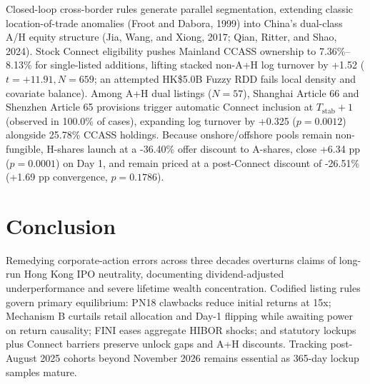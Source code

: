 \documentclass[12pt,letterpaper]{article}
\begin{document}
Closed-loop cross-border rules generate parallel segmentation, extending classic location-of-trade anomalies (Froot and Dabora, 1999) into China's dual-class A/H equity structure (Jia, Wang, and Xiong, 2017; Qian, Ritter, and Shao, 2024). Stock Connect eligibility pushes Mainland CCASS ownership to 7.36\%--8.13\% for single-listed additions, lifting stacked non-A+H log turnover by +1.52 ($t = +11.91, N = 659$; an attempted HK\$5.0B Fuzzy RDD fails local density and covariate balance). Among A+H dual listings ($N = 57$), Shanghai Article 66 and Shenzhen Article 65 provisions trigger automatic Connect inclusion at $T_{\text{stab}} + 1$ (observed in 100.0\% of cases), expanding log turnover by +0.325 ($p = 0.0012$) alongside 25.78\% CCASS holdings. Because onshore/offshore pools remain non-fungible, H-shares launch at a -36.40\% offer discount to A-shares, close +6.34 pp ($p = 0.0001$) on Day 1, and remain priced at a post-Connect discount of -26.51\% (+1.69 pp convergence, $p = 0.1786$).

\section{Conclusion}

Remedying corporate-action errors across three decades overturns claims of long-run Hong Kong IPO neutrality, documenting dividend-adjusted underperformance and severe lifetime wealth concentration. Codified listing rules govern primary equilibrium: PN18 clawbacks reduce initial returns at 15x; Mechanism B curtails retail allocation and Day-1 flipping while awaiting power on return causality; FINI eases aggregate HIBOR shocks; and statutory lockups plus Connect barriers preserve unlock gaps and A+H discounts. Tracking post-August 2025 cohorts beyond November 2026 remains essential as 365-day lockup samples mature.

\vspace{4pt}
\end{document}
